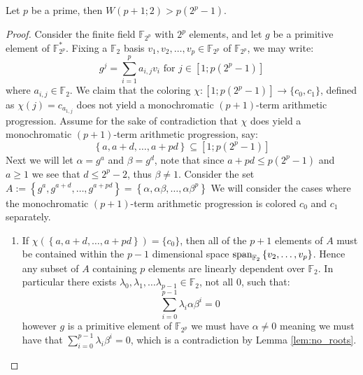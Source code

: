 \begin{theorem}\label{thm:berlekamps_lower_bound}
	Let $p$ be a prime, then $W(p + 1; 2) > p (2^{p} - 1)$.
\end{theorem}
\begin{proof}
	Consider the finite field $\mathbb{F}_{2^p}$ with $2^p$ elements, and let $g$ be a primitive element of $\mathbb{F}_{2^p}^{*}$. Fixing a $\mathbb{F}_{2}$ basis $v_1, v_2, \ldots, v_p \in \mathbb{F}_{2^p}$ of $\mathbb{F}_{2^{p}}$, we may write:
	\begin{equation}\label{eq:lin_comb}
		g^j = \sum_{i = 1}^p a_{i,j} v_i \text{ for } j \in [1; p(2^p - 1)]
	\end{equation}
	where $a_{i, j} \in \mathbb{F}_2$. We claim that the coloring $\chi: [1; p(2^p - 1)] \to \{c_0, c_1\}$, defined as $\chi(j) = c_{a_{1, j}}$ does not yield a monochromatic $(p + 1)$-term arithmetic progression. Assume for the sake of contradiction that $\chi$ does yield a monochromatic $(p + 1)$-term arithmetic progression, say:
	\begin{equation*}
		\left\{a, a + d, \ldots, a + pd\right\} \subseteq [1; p(2^p - 1)]
	\end{equation*}
	Next we will let $\alpha = g^{a}$ and $\beta = g^{d}$, note that since $a + pd \leq p(2^p - 1)$ and $a \geq 1$ we see that $d \leq 2^p - 2$, thus $\beta \neq 1$. Consider the set $A := \left\{g^a, g^{a + d}, \ldots, g^{a + pd}\right\} = \left\{\alpha, \alpha \beta, \ldots, \alpha \beta^{p}\right\}$
	We will consider the cases where the monochromatic $(p + 1)$-term arithmetic progression is colored $c_0$ and $c_1$ separately.
	\begin{enumerate}
		\item If $\chi\left(\left\{a, a + d, \ldots, a + pd\right\}\right) = \{c_0\}$, then all of the $p + 1$ elements of $A$ must be contained within the $p - 1$ dimensional space $\textnormal{span}_{\mathbb{F}_2} \left\{v_2, \ldots, v_{p}\right\}$. Hence any subset of $A$ containing $p$ elements are linearly dependent over $\mathbb{F}_2$. In particular there exists $\lambda_0, \lambda_1, \ldots \lambda_{p - 1} \in \mathbb{F}_2$, not all $0$, such that:
		      \begin{equation*}
			      \sum_{i = 0}^{p - 1} \lambda_i \alpha \beta^{i} = 0
		      \end{equation*}
		      however $g$ is a primitive element of $\mathbb{F}_{2^p}$ we must have $\alpha \neq 0$ meaning we must have that $\sum_{i = 0}^{p - 1} \lambda_i \beta^i = 0$, which is a contradiction by Lemma \ref{lem:no_roots}.

\end{enumerate}
\end{proof}
